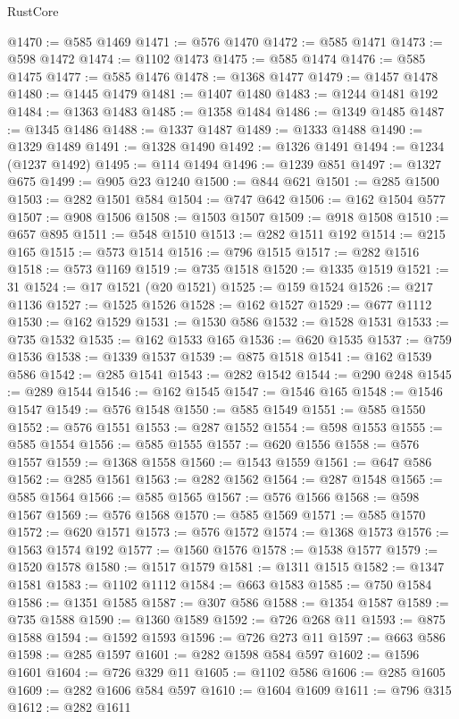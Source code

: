 \begin{lexlean}{RustCore}
\begin{coremodule}
@1470 := @585 @1469
@1471 := @576 @1470
@1472 := @585 @1471
@1473 := @598 @1472
@1474 := @1102 @1473
@1475 := @585 @1474
@1476 := @585 @1475
@1477 := @585 @1476
@1478 := @1368 @1477
@1479 := @1457 @1478
@1480 := @1445 @1479
@1481 := @1407 @1480
@1483 := @1244 @1481 @192
@1484 := @1363 @1483
@1485 := @1358 @1484
@1486 := @1349 @1485
@1487 := @1345 @1486
@1488 := @1337 @1487
@1489 := @1333 @1488
@1490 := @1329 @1489
@1491 := @1328 @1490
@1492 := @1326 @1491
@1494 := @1234 (@1237 @1492)
@1495 := @114 @1494
@1496 := @1239 @851
@1497 := @1327 @675
@1499 := @905 @23 @1240
@1500 := @844 @621
@1501 := @285 @1500
@1503 := @282 @1501 @584
@1504 := @747 @642
@1506 := @162 @1504 @577
@1507 := @908 @1506
@1508 := @1503 @1507
@1509 := @918 @1508
@1510 := @657 @895
@1511 := @548 @1510
@1513 := @282 @1511 @192
@1514 := @215 @165
@1515 := @573 @1514
@1516 := @796 @1515
@1517 := @282 @1516
@1518 := @573 @1169
@1519 := @735 @1518
@1520 := @1335 @1519
@1521 := 31
@1524 := @17 @1521 (@20 @1521)
@1525 := @159 @1524
@1526 := @217 @1136
@1527 := @1525 @1526
@1528 := @162 @1527
@1529 := @677 @1112
@1530 := @162 @1529
@1531 := @1530 @586
@1532 := @1528 @1531
@1533 := @735 @1532
@1535 := @162 @1533 @165
@1536 := @620 @1535
@1537 := @759 @1536
@1538 := @1339 @1537
@1539 := @875 @1518
@1541 := @162 @1539 @586
@1542 := @285 @1541
@1543 := @282 @1542
@1544 := @290 @248
@1545 := @289 @1544
@1546 := @162 @1545
@1547 := @1546 @165
@1548 := @1546 @1547
@1549 := @576 @1548
@1550 := @585 @1549
@1551 := @585 @1550
@1552 := @576 @1551
@1553 := @287 @1552
@1554 := @598 @1553
@1555 := @585 @1554
@1556 := @585 @1555
@1557 := @620 @1556
@1558 := @576 @1557
@1559 := @1368 @1558
@1560 := @1543 @1559
@1561 := @647 @586
@1562 := @285 @1561
@1563 := @282 @1562
@1564 := @287 @1548
@1565 := @585 @1564
@1566 := @585 @1565
@1567 := @576 @1566
@1568 := @598 @1567
@1569 := @576 @1568
@1570 := @585 @1569
@1571 := @585 @1570
@1572 := @620 @1571
@1573 := @576 @1572
@1574 := @1368 @1573
@1576 := @1563 @1574 @192
@1577 := @1560 @1576
@1578 := @1538 @1577
@1579 := @1520 @1578
@1580 := @1517 @1579
@1581 := @1311 @1515
@1582 := @1347 @1581
@1583 := @1102 @1112
@1584 := @663 @1583
@1585 := @750 @1584
@1586 := @1351 @1585
@1587 := @307 @586
@1588 := @1354 @1587
@1589 := @735 @1588
@1590 := @1360 @1589
@1592 := @726 @268 @11
@1593 := @875 @1588
@1594 := @1592 @1593
@1596 := @726 @273 @11
@1597 := @663 @586
@1598 := @285 @1597
@1601 := @282 @1598 @584 @597
@1602 := @1596 @1601
@1604 := @726 @329 @11
@1605 := @1102 @586
@1606 := @285 @1605
@1609 := @282 @1606 @584 @597
@1610 := @1604 @1609
@1611 := @796 @315
@1612 := @282 @1611

\end{coremodule}
\end{lexlean}
